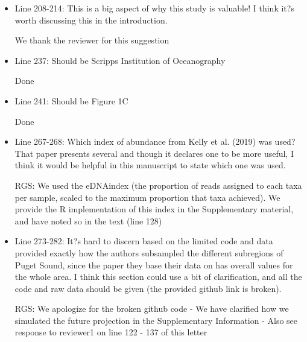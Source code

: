 \documentclass[11pt]{article}
\begin{document}
\begin{linenumbers}
\begin{itemize}
\item{Line 208-214: This is a big aspect of why this study is valuable! I think it?s worth discussing this in the introduction.}

{\color{red} We thank the reviewer for this suggestion }


\item{Line 237: Should be Scripps Institution of Oceanography}

{\color{red} Done }


\item{Line 241: Should be Figure 1C}

{\color{red} Done }


\item{Line 267-268: Which index of abundance from Kelly et al. (2019) was used? That paper presents several and though it declares one to be more useful, I think it would be helpful in this manuscript to state which one was used.}

{\color{red} RGS: We used the eDNAindex (the proportion of reads assigned to each taxa per sample, scaled to the maximum proportion that taxa achieved). We provide the R implementation of this index in the Supplementary material, and have noted so in the text (line 128) }


\item{Line 273-282: It?s hard to discern based on the limited code and data provided exactly how the authors subsampled the different subregions of Puget Sound, since the paper they base their data on has overall values for the whole area. I think this section could use a bit of clarification, and all the code and raw data should be given (the provided github link is broken).}

{\color{red} RGS: We apologize for the broken github code - We have clarified how we simulated the future projection in the Supplementary Information - Also see response to reviewer1 on line 122 - 137 of this letter  }


\end{itemize}
 \end{linenumbers}
\end{document}
